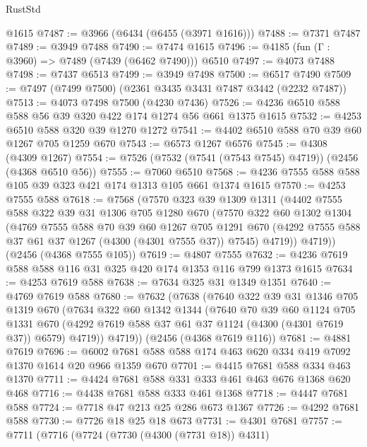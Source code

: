 \begin{lexlean}{RustStd}
\begin{coremodule}
    @1615
@7487 := @3966 (@6434 (@6455 (@3971 @1616)))
@7488 := @7371 @7487
@7489 := @3949 @7488
@7490 := @7474 @1615
@7496 := @4185 (fun (Γ : @3960) => @7489 (@7439 (@6462 @7490))) @6510
@7497 := @4073 @7488
@7498 := @7437 @6513
@7499 := @3949 @7498
@7500 := @6517 @7490
@7509 := @7497 (@7499 @7500) (@2361 @3435 @3431 @7487 @3442 (@2232 @7487))
@7513 := @4073 @7498 @7500 (@4230 @7436)
@7526 := @4236 @6510 @588 @588 @56 @39 @320 @422 @174 @1274 @56 @661 @1375 @1615
@7532 := @4253 @6510 @588 @320 @39 @1270 @1272
@7541 := @4402 @6510 @588 @70 @39 @60 @1267 @705 @1259 @670
@7543 := @6573 @1267 @6576
@7545 := @4308 (@4309 @1267)
@7554 := @7526 (@7532 (@7541 (@7543 @7545) @4719)) (@2456 (@4368 @6510 @56))
@7555 := @7060 @6510
@7568 := @4236 @7555 @588 @588 @105 @39 @323 @421 @174 @1313 @105 @661 @1374 @1615
@7570 := @4253 @7555 @588
@7618 := @7568
    (@7570
      @323
      @39
      @1309
      @1311
      (@4402
        @7555
        @588
        @322
        @39
        @31
        @1306
        @705
        @1280
        @670
        (@7570
          @322
          @60
          @1302
          @1304
          (@4769
            @7555
            @588
            @70
            @39
            @60
            @1267
            @705
            @1291
            @670
            (@4292 @7555 @588 @37 @61 @37 @1267 (@4300 (@4301 @7555 @37)) @7545)
            @4719))
        @4719))
    (@2456 (@4368 @7555 @105))
@7619 := @4807 @7555
@7632 := @4236 @7619 @588 @588 @116 @31 @325 @420 @174 @1353 @116 @799 @1373 @1615
@7634 := @4253 @7619 @588
@7638 := @7634 @325 @31 @1349 @1351
@7640 := @4769 @7619 @588
@7680 := @7632
    (@7638
      (@7640
        @322
        @39
        @31
        @1346
        @705
        @1319
        @670
        (@7634
          @322
          @60
          @1342
          @1344
          (@7640
            @70
            @39
            @60
            @1124
            @705
            @1331
            @670
            (@4292 @7619 @588 @37 @61 @37 @1124 (@4300 (@4301 @7619 @37)) @6579)
            @4719))
        @4719))
    (@2456 (@4368 @7619 @116))
@7681 := @4881 @7619
@7696 := @6002 @7681 @588 @588 @174 @463 @620 @334 @419 @7092 @1370 @1614 @20 @966 @1359 @670
@7701 := @4415 @7681 @588 @334 @463 @1370
@7711 := @4424 @7681 @588 @331 @333 @461 @463 @676 @1368 @620 @468
@7716 := @4438 @7681 @588 @333 @461 @1368
@7718 := @4447 @7681 @588
@7724 := @7718 @47 @213 @25 @286 @673 @1367
@7726 := @4292 @7681 @588
@7730 := @7726 @18 @25 @18 @673
@7731 := @4301 @7681
@7757 := @7711
    (@7716
      (@7724
        (@7730 (@4300 (@7731 @18)) @4311)

\end{coremodule}
\end{lexlean}

